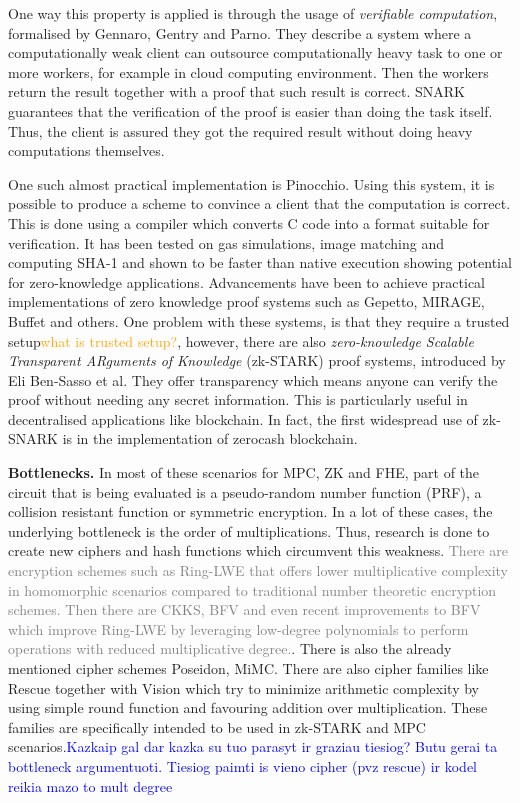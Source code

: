\documentclass{Resources/UoBLab1}
\theoremstyle{definition}
\begin{document}
One way this property is applied is through the usage of \textit{verifiable computation}, formalised by Gennaro, Gentry and Parno\cite{UntrustedWorkers}. They describe a system where a computationally weak client can outsource computationally heavy task to one or more workers, for example in cloud computing environment. Then the workers return the result together with a proof that such result is correct. SNARK guarantees that the verification of the proof is easier than doing the task itself. Thus, the client is assured they got the required result without doing heavy computations themselves.

One such almost practical implementation is Pinocchio\cite{Pinocchio}. Using this system, it is possible to produce a scheme to convince a client that the computation is correct. This is done using a compiler which converts C code into a format suitable for verification. It has been tested on gas simulations, image matching and computing SHA-1 and shown to be faster than native execution showing potential for zero-knowledge applications. Advancements have been to achieve practical implementations of zero knowledge proof systems such as Gepetto\cite{Gepetto}, MIRAGE\cite{Mirage}, Buffet\cite{Buffet} and others. One problem with these systems, is that they require a trusted setup\textcolor{orange}{what is trusted setup?}, however, there are also \textit{zero-knowledge Scalable Transparent ARguments of Knowledge} (zk-STARK) proof systems, introduced by Eli Ben-Sasso et al\cite{STARK}. They offer transparency which means anyone can verify the proof without needing any secret information. This is particularly useful in decentralised applications like blockchain. In fact, the first widespread use of zk-SNARK is in the implementation of zerocash blockchain\cite{zcash}.\medskip

\noindent\textbf{Bottlenecks.} In most of these scenarios for MPC, ZK and FHE, part of the circuit that is being evaluated is a pseudo-random number function (PRF), a collision resistant function or symmetric encryption. In a lot of these cases, the underlying bottleneck is the order of multiplications. Thus, research is done to create new ciphers and hash functions which circumvent this weakness. \textcolor{gray}{There are encryption schemes such as Ring-LWE\cite{RINGLWE} that offers lower multiplicative complexity in homomorphic scenarios compared to traditional number theoretic encryption schemes. Then there are CKKS\cite{CKKS}, BFV\cite{BFV1}\cite{BFV2} and even recent improvements to BFV\cite{BFVImprov} which improve Ring-LWE by leveraging low-degree polynomials to perform operations with reduced multiplicative degree.}. There is also the already mentioned cipher schemes Poseidon\cite{Poseidon}, MiMC\cite{MiMC}. There are also cipher families like Rescue together with Vision\cite{Rescue} which try to minimize arithmetic complexity by using simple round function and favouring addition over multiplication. These families are specifically intended to be used in zk-STARK and MPC scenarios.\textcolor{blue}{Kazkaip gal dar kazka su tuo parasyt ir graziau tiesiog? Butu gerai ta bottleneck argumentuoti. Tiesiog paimti is vieno cipher (pvz rescue) ir kodel reikia mazo to mult degree}
\end{document}
